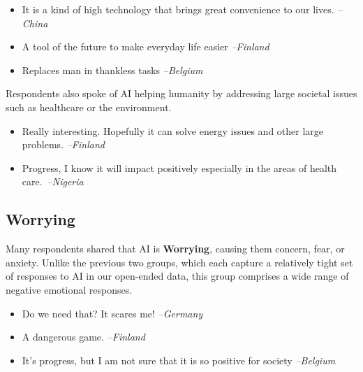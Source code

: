 \documentclass[11pt]{article} %
\newcommand\aff[1]{\textcolor{darkplum}{{\emph{--#1}}}}
\newenvironment{lq2}
{ \vspace{-3pt}
  \begin{itemize}[leftmargin = 4.0em, rightmargin=5.0em, label={}]
    \fontsize{10pt}{10.7pt}\selectfont
    \setlength{\itemsep}{3pt}
    \setlength{\parskip}{2.5pt}
    \setlength{\parsep}{3pt}     }
{ \end{itemize} \vspace{1pt}  }
\def\Worrying/{{\fontfamily{lmss}\selectfont\textbf{Worrying}}}
\begin{document}
\begin{lq2}
\item It is a kind of high technology that brings great convenience to our lives. \aff{China}
\item A tool of the future to make everyday life easier \aff{Finland}
\item Replaces man in thankless tasks \aff{Belgium}
\end{lq2}

Respondents also spoke of AI helping humanity by addressing large societal issues such as healthcare or the environment.
\begin{lq2}
\item Really interesting. Hopefully it can solve energy issues and other large problems. \aff{Finland}
\item Progress, I know it will impact positively especially in the areas of health care.~\aff{Nigeria}
\end{lq2}

\subsection{Worrying}
Many respondents shared that AI is \Worrying/, causing them concern, fear, or anxiety. Unlike the previous two groups, which each capture a relatively tight set of responses to AI in our open-ended data, this group comprises a wide range of negative emotional responses.
\begin{lq2}
\item Do we need that? It scares me! \aff{Germany}
\item A dangerous game. \aff{Finland}
\item It's progress, but I am not sure that it is so positive for society \aff{Belgium}
\end{lq2}
\end{document}

